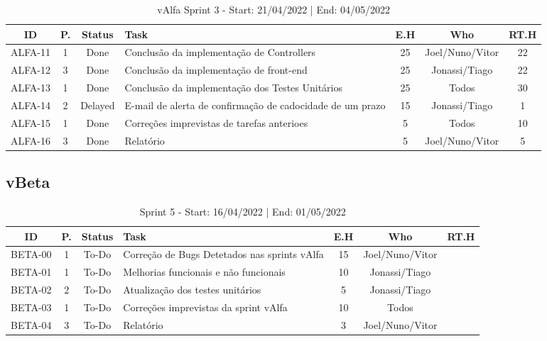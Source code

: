 \begin{table}[h]
    \centering
    \begin{tabular}{|c|c|c| m{18em} |c|c|c|}
        \hline
        ID & P. & Status & Task & E.H & Who & RT.H \\
        \hline                               %
        ALFA-11 & 1 & Done & Conclusão da implementação de Controllers & 25 & Joel/Nuno/Vitor & 22 \\
        ALFA-12 & 3 & Done & Conclusão da implementação de front-end & 25 & Jonassi/Tiago & 22 \\
        ALFA-13 & 1 & Done & Conclusão da implementação dos Testes Unitários & 25 & Todos & 30 \\
        ALFA-14 & 2 & Delayed & E-mail de alerta de confirmação de cadocidade de um prazo & 15 & Jonassi/Tiago & 1 \\
        ALFA-15 & 1 & Done & Correções imprevistas de tarefas anterioes & 5 & Todos & 10 \\
        ALFA-16 & 3 & Done & Relatório & 5 & Joel/Nuno/Vitor & 5 \\
        \hline 
    \end{tabular}
    \caption{vAlfa Sprint 3 - Start: 21/04/2022 | End: 04/05/2022}
\end{table}
\newpage

\subsection{vBeta}

\begin{table}[h]
    \centering
    \begin{tabular}{|c|c|c| m{18em} |c|c|c|}
        \hline
        ID & P. & Status & Task & E.H & Who & RT.H \\
        \hline                               %
        BETA-00 & 1 & To-Do & Correção de Bugs Detetados nas sprints vAlfa & 15 & Joel/Nuno/Vitor & \\
        BETA-01 & 1 & To-Do & Melhorias funcionais e não funcionais & 10 & Jonassi/Tiago & \\
        BETA-02 & 2 & To-Do & Atualização dos testes unitários & 5 & Jonassi/Tiago & \\
        BETA-03 & 1 & To-Do & Correções imprevistas da sprint vAlfa & 10 & Todos & \\
        BETA-04 & 3 & To-Do & Relatório & 3 & Joel/Nuno/Vitor &  \\
        \hline 
    \end{tabular}
    \caption{Sprint 5 - Start: 16/04/2022 | End: 01/05/2022}
\end{table}


